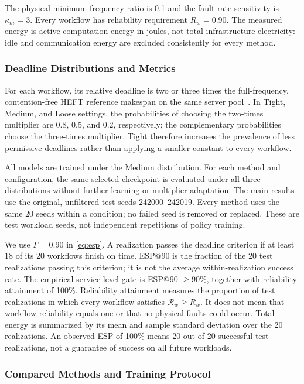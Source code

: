 The physical minimum frequency ratio is 0.1 and the fault-rate
sensitivity is $\kappa_m=3$. Every workflow has reliability requirement
$R_w=0.90$. The measured energy is active computation energy in joules,
not total infrastructure electricity: idle and communication energy are
excluded consistently for every method.

\subsubsection{Deadline Distributions and Metrics}

For each workflow, its relative deadline is two or three times the
full-frequency, contention-free HEFT reference makespan on the same
server pool~\cite{topcuoglu2002}. In Tight, Medium, and Loose settings,
the probabilities of choosing the two-times multiplier are 0.8, 0.5,
and 0.2, respectively; the complementary probabilities choose the
three-times multiplier. Tight therefore increases the prevalence of
less permissive deadlines rather than applying a smaller constant to
every workflow.

All models are trained under the Medium distribution. For each method
and configuration, the same selected checkpoint is evaluated under all
three distributions without further learning or multiplier adaptation.
The main results use the original, unfiltered test seeds
242000--242019. Every method uses the same 20 seeds within a condition;
no failed seed is removed or replaced. These are test workload seeds,
not independent repetitions of policy training.

We use $\Gamma=0.90$ in \eqref{eq:esp}. A realization passes the deadline
criterion if at least 18 of its 20 workflows finish on time. ESP@90 is
the fraction of the 20 test realizations passing this criterion; it is
not the average within-realization success rate. The empirical
service-level gate is ESP@90 $\geq90\%$, together with reliability
attainment of 100\%. Reliability attainment measures the proportion of
test realizations in which every workflow satisfies
$\mathcal R_w\geq R_w$. It does not mean that workflow reliability
equals one or that no physical faults could occur. Total energy is
summarized by its mean and sample standard deviation over the 20
realizations. An observed ESP of 100\% means 20 out of 20 successful
test realizations, not a guarantee of success on all future workloads.

\subsubsection{Compared Methods and Training Protocol}

